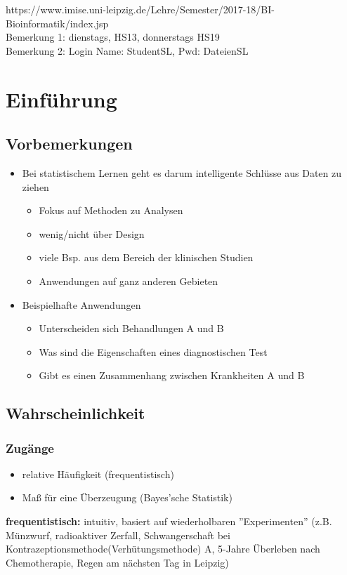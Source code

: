 \documentclass[../VorlesungMaster.tex]{subfiles}
\begin{document}
\begin{center}
		https://www.imise.uni-leipzig.de/Lehre/Semester/2017-18/BI-Bioinformatik/index.jsp\\
		Bemerkung 1: dienstags, HS13, donnerstags HS19\\
		Bemerkung 2: Login Name: StudentSL, Pwd: DateienSL
	\end{center}

	\section{Einführung}
	\subsection{Vorbemerkungen}
	\begin{itemize}
		\item Bei statistischem Lernen geht es darum intelligente Schlüsse aus Daten zu ziehen
		\begin{itemize}
			\item Fokus auf Methoden zu Analysen
			\item wenig/nicht über Design
			\item viele Bsp. aus dem Bereich der klinischen Studien
			\item Anwendungen auf ganz anderen Gebieten
		\end{itemize}
	\item Beispielhafte Anwendungen
	\begin{itemize}
		\item Unterscheiden sich Behandlungen A und B
		\item Was sind die Eigenschaften eines diagnostischen Test
		\item Gibt es einen Zusammenhang zwischen Krankheiten A und B
	\end{itemize}
	\end{itemize}
\subsection{Wahrscheinlichkeit}
\subsubsection{Zugänge}
\begin{itemize}
	\item relative Häufigkeit (frequentistisch)
	\item Maß für eine Überzeugung (Bayes'sche Statistik)
\end{itemize}
\textbf{frequentistisch:} intuitiv, basiert auf wiederholbaren ''Experimenten'' (z.B. Münzwurf, radioaktiver Zerfall, Schwangerschaft bei Kontrazeptionsmethode(Verhütungsmethode) A, 5-Jahre Überleben nach Chemotherapie, Regen am nächsten Tag in Leipzig)
\end{document}
